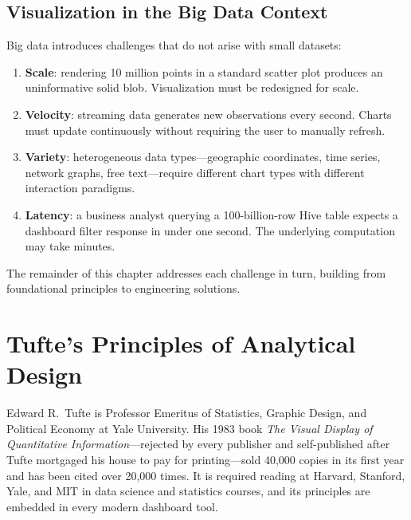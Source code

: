\subsection{Visualization in the Big Data Context}
\label{subsec:viz-bigdata}

Big data introduces challenges that do not arise with small datasets:
\begin{enumerate}
  \item \textbf{Scale}: rendering 10 million points in a standard scatter
        plot produces an uninformative solid blob. Visualization must be
        redesigned for scale.
  \item \textbf{Velocity}: streaming data generates new observations every
        second. Charts must update continuously without requiring the user
        to manually refresh.
  \item \textbf{Variety}: heterogeneous data types---geographic coordinates,
        time series, network graphs, free text---require different chart
        types with different interaction paradigms.
  \item \textbf{Latency}: a business analyst querying a 100-billion-row
        Hive table expects a dashboard filter response in under one second.
        The underlying computation may take minutes.
\end{enumerate}

The remainder of this chapter addresses each challenge in turn, building
from foundational principles to engineering solutions.

\section{Tufte's Principles of Analytical Design}
\label{sec:tufte}

Edward R.\ Tufte is Professor Emeritus of Statistics, Graphic Design, and
Political Economy at Yale University. His 1983 book \textit{The Visual
Display of Quantitative Information}---rejected by every publisher and
self-published after Tufte mortgaged his house to pay for printing---sold
40{,}000 copies in its first year and has been cited over 20{,}000 times.
It is required reading at Harvard, Stanford, Yale, and MIT in data science
and statistics courses, and its principles are embedded in every modern
dashboard tool.

